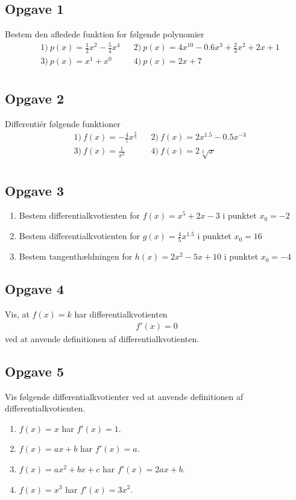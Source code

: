 \subsection*{Opgave 1}
Bestem den afledede funktion for følgende polynomier
\begin{align*}
	&1) \ p(x) = \frac{1}{2}x^2 -\frac{5}{4}x^4   &&2) \ p(x) = 4x^{10} - 0.6x^{3}+\frac{2}{3}x^{2}+2x+1\\
	&3) \ p(x) = x^{1} + x^0  &&4) \ p(x) = 2x + 7     \\ 
\end{align*}

\subsection*{Opgave 2}
Differentiér følgende funktioner
\begin{align*}
	&1) \ f(x) = -\frac{4}{7}x^{\frac{2}{5}}   &&2) \ f(x) = 2x^{1.5}-0.5x^{-3}\\
	&3) \ f(x) = \frac{1}{x^2}  &&4) \ f(x) = 2\sqrt[3]{x}     \\ 
\end{align*}

\subsection*{Opgave 3}
\begin{enumerate}[label=\roman*)]
	\item Bestem differentialkvotienten for $f(x) = x^5+2x -3$ i punktet $x_0 = -2$
	\item Bestem differentialkvotienten for $g(x) = \frac{4}{5}x^{1.5}$ i punktet $x_0 =16$
	\item Bestem tangenthældningen for $h(x) = 2x^{2}-5x+10$ i punktet $x_0 = -4$
\end{enumerate}

\newpage
\subsection*{Opgave 4}
Vis, at $f(x) = k$ har differentialkvotienten
\begin{align*}
	f'(x) = 0
\end{align*}
ved at anvende definitionen af differentialkvotienten.

\subsection*{Opgave 5}
Vis følgende differentialkvotienter ved at anvende definitionen af differentialkvotienten.
\begin{enumerate}[label=\roman*)]
	\item $f(x) = x$ har $f'(x) = 1$.
	\item $f(x) = ax + b$ har $f'(x) = a$.
	\item $f(x) = ax^2 + bx + c$ har $f'(x) = 2ax + b$.
	\item $f(x) = x^3$ har $f'(x) = 3x^2$.
\end{enumerate}